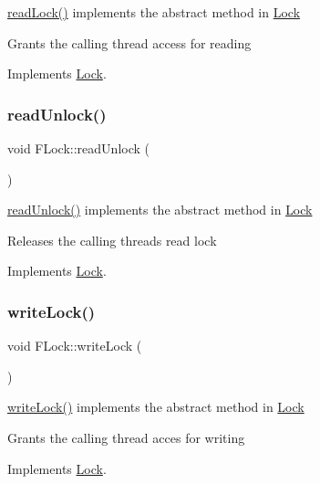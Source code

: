 \hyperlink{class_f_lock_a8b1cde1cfe107eeb20d5f250a1c310e6}{read\+Lock()} implements the abstract method in \hyperlink{class_lock}{Lock} 

Grants the calling thread access for reading 

Implements \hyperlink{class_lock}{Lock}.

\mbox{\label{class_f_lock_ab643a836b8844cc9be52dcaf7ab18df1}} 
\subsubsection{\texorpdfstring{read\+Unlock()}{readUnlock()}}
{\footnotesize\ttfamily void F\+Lock\+::read\+Unlock (\begin{DoxyParamCaption}{ }\end{DoxyParamCaption})\hspace{0.3cm}{\ttfamily [virtual]}}



\hyperlink{class_f_lock_ab643a836b8844cc9be52dcaf7ab18df1}{read\+Unlock()} implements the abstract method in \hyperlink{class_lock}{Lock} 

Releases the calling thread\textquotesingle{}s read lock 

Implements \hyperlink{class_lock}{Lock}.

\mbox{\label{class_f_lock_a4bd70bd74a3c6067f091d24a0b82edbe}} 
\subsubsection{\texorpdfstring{write\+Lock()}{writeLock()}}
{\footnotesize\ttfamily void F\+Lock\+::write\+Lock (\begin{DoxyParamCaption}{ }\end{DoxyParamCaption})\hspace{0.3cm}{\ttfamily [virtual]}}



\hyperlink{class_f_lock_a4bd70bd74a3c6067f091d24a0b82edbe}{write\+Lock()} implements the abstract method in \hyperlink{class_lock}{Lock} 

Grants the calling thread acces for writing 

Implements \hyperlink{class_lock}{Lock}.

